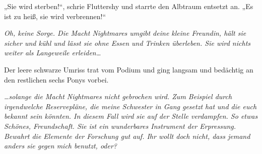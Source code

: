 „Sie wird sterben!“, schrie Fluttershy und starrte den Albtraum entsetzt an. „Es ist zu heiß, sie wird verbrennen!“

\emph{Oh, keine Sorge. Die Macht Nightmares umgibt deine kleine Freundin, hält sie sicher und kühl und lässt sie ohne Essen und Trinken überleben. Sie wird nichts weiter als Langeweile erleiden…}

Der leere schwarze Umriss trat vom Podium und ging langsam und bedächtig an den restlichen sechs Ponys vorbei.

\emph{…solange die Macht Nightmares nicht gebrochen wird. Zum Beispiel durch irgendwelche Reservepläne, die meine Schwester in Gang gesetzt hat und die euch bekannt sein könnten. In diesem Fall wird sie auf der Stelle verdampfen. So etwas Schönes, Freundschaft. Sie ist ein wunderbares Instrument der Erpressung. Bewahrt die Elemente der Forschung gut auf. Ihr wollt doch nicht, dass jemand anders sie gegen mich benutzt, oder?}

